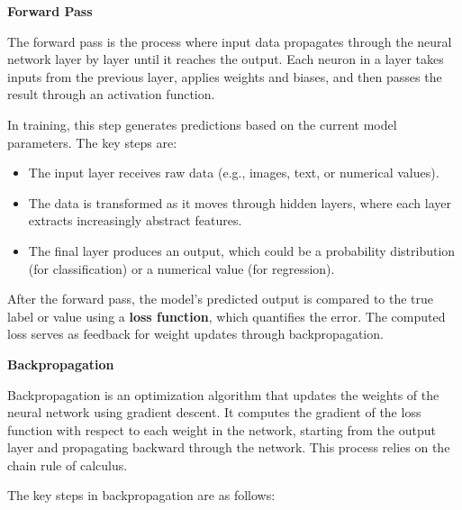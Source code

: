 \textbf{Forward Pass}

The forward pass is the process where input data propagates through the neural network layer by layer until it reaches the output. Each neuron in a layer takes inputs from the previous layer, applies weights and biases, and then passes the result through an activation function.  

In training, this step generates predictions based on the current model parameters. The key steps are:  
\begin{itemize}
    \item The input layer receives raw data (e.g., images, text, or numerical values).  
    \item The data is transformed as it moves through hidden layers, where each layer extracts increasingly abstract features.  
    \item The final layer produces an output, which could be a probability distribution (for classification) or a numerical value (for regression).  
\end{itemize}  

After the forward pass, the model's predicted output is compared to the true label or value using a \textbf{loss function}, which quantifies the error. The computed loss serves as feedback for weight updates through backpropagation.  

\bigskip  

\textbf{Backpropagation} 

Backpropagation is an optimization algorithm that updates the weights of the neural network using gradient descent. It computes the gradient of the loss function with respect to each weight in the network, starting from the output layer and propagating backward through the network. This process relies on the chain rule of calculus.  

The key steps in backpropagation are as follows:

